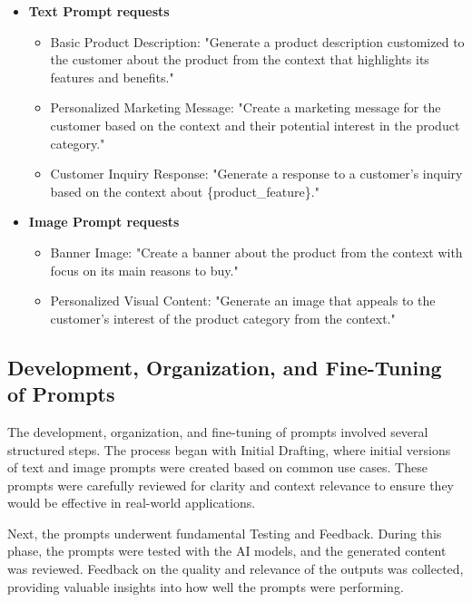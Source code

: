 \documentclass[%
pdftex,
oneside,			%
11pt,				%
parskip=half,		%
headheight = 12pt,	%
headsepline,		%
footsepline,		%
footheight = 16pt,	%
abstracton,		%
DIV=calc,		%
BCOR=8mm,		%
headinclude=false,	%
footinclude=false,	%
listof=totoc,		%
toc=bibliography,	%
]{scrreprt}	%
\begin{document}
            \begin{itemize}
                \item \textbf{Text Prompt requests}
                \begin{itemize}
                    \item Basic Product Description: "Generate a product description customized to the customer about the product from the context that highlights its features and benefits."
                    \item Personalized Marketing Message: "Create a marketing message for the customer based on the context and their potential interest in the product category."
                    \item Customer Inquiry Response: "Generate a response to a customer's inquiry based on the context about \{product\_feature\}."
                \end{itemize}

                \item \textbf{Image Prompt requests}
                \begin{itemize}
                    \item Banner Image: "Create a banner about the product from the context with focus on its main reasons to buy."
                    \item Personalized Visual Content: "Generate an image that appeals to the customer's interest of the product category from the context."
                \end{itemize}
            \end{itemize}

        \subsection{Development, Organization, and Fine-Tuning of Prompts}

            The development, organization, and fine-tuning of prompts involved several structured steps. 
            The process began with Initial Drafting, where initial versions of text and image prompts were created based on common use cases. 
            These prompts were carefully reviewed for clarity and context relevance to ensure they would be effective in real-world applications.
            
            Next, the prompts underwent fundamental Testing and Feedback. 
            During this phase, the prompts were tested with the AI models, and the generated content was reviewed. 
            Feedback on the quality and relevance of the outputs was collected, providing valuable insights into how well the prompts were performing.
            
\end{document}
